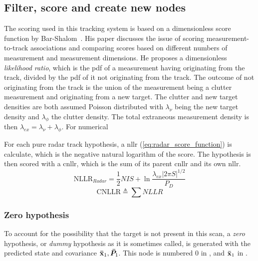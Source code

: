 \subsection{Filter, score and create new nodes}
The scoring used in this tracking system is based on a dimensionless score function by Bar-Shalom~\cite{Bar-Shalom2007}. His paper discusses the issue of scoring measurement-to-track associations and comparing scores based on different numbers of measurement and measurement dimensions. He proposes a dimensionless \emph{likelihood ratio}, which is the \gls{pdf} of a measurement having originating from the track, divided by the \gls{pdf} of it not originating from the track. The outcome of not originating from the track is the union of the measurement being a clutter measurement and originating from a new target. The clutter and new target densities are both assumed Poisson distributed with \( \lambda_\nu \) being the new target density and \( \lambda_\phi \) the clutter density. The total extraneous measurement density is then \( \lambda_{ex} = \lambda_\nu + \lambda_\phi \). For numerical 

For each pure radar \gls{track hypothesis}, a \gls{nllr} (\ref{eq:radar_score_function}) is calculate, which is the negative natural logarithm of the score. The hypothesis is then scored with a \gls{cnllr}, which is the sum of its parent \gls{cnllr} and its own \gls{nllr}.
\begin{equation}\label{eq:radar_score_function}
\mathrm{NLLR}_{Radar} = \frac{1}{2} NIS + \ln \frac{\lambda_{ex} |2 \pi S|^{1/2}} {P_D}		
\end{equation}
\begin{equation}
\mathrm{CNLLR} \triangleq \sum NLLR
\end{equation}

\subsubsection{Zero hypothesis}\label{subsubsec:radar_zero_hypothesis}
To account for the possibility that the target is not present in this scan, a \emph{zero} hypothesis, or \emph{dummy} hypothesis as it is sometimes called, is generated with the predicted state and covariance \(\boldsymbol{\mathbf{\bar{x}}}_1, \bm{\bar{P}}_1\). This node is numbered 0 in , and \(\boldsymbol{\mathbf{\bar{x}}}_1\) in .

